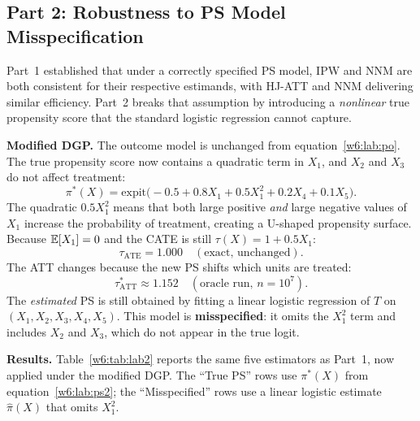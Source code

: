 \documentclass[master.tex]{subfiles}
\begin{document}
\subsection{Part 2: Robustness to PS Model Misspecification}
\label{w6:sec:lab:part2}

Part~1 established that under a correctly specified PS model, IPW and
NNM are both consistent for their respective estimands, with HJ-ATT
and NNM delivering similar efficiency.  Part~2 breaks that assumption
by introducing a \emph{nonlinear} true propensity score that the
standard logistic regression cannot capture.

\medskip\noindent\textbf{Modified DGP.}
The outcome model is unchanged from equation~\eqref{w6:lab:po}.  The
true propensity score now contains a quadratic term in $X_1$, and $X_2$
and $X_3$ do not affect treatment:
\begin{equation}
  \pi^*(X) = \mathrm{expit}\!\bigl(-0.5 + 0.8X_1 + 0.5X_1^2 + 0.2X_4 + 0.1X_5\bigr).
  \label{w6:lab:ps2}
\end{equation}
The quadratic $0.5X_1^2$ means that both large positive \emph{and}
large negative values of $X_1$ increase the probability of treatment,
creating a U-shaped propensity surface.  Because $\mathbb{E}[X_1] = 0$ and
the CATE is still $\tau(X) = 1 + 0.5X_1$:
\[
  \tau_{\mathrm{ATE}} = 1.000 \quad (\text{exact, unchanged}).
\]
The ATT changes because the new PS shifts which units are treated:
\begin{equation}
  \tau_{\mathrm{ATT}}^* \approx 1.152
  \quad (\text{oracle run, }n = 10^7).
  \label{w6:lab:att2}
\end{equation}
The \emph{estimated} PS is still obtained by fitting a linear logistic
regression of $T$ on $(X_1, X_2, X_3, X_4, X_5)$.  This model is
\textbf{misspecified}: it omits the $X_1^2$ term and includes $X_2$
and $X_3$, which do not appear in the true logit.

\medskip\noindent\textbf{Results.}
Table~\ref{w6:tab:lab2} reports the same five estimators as Part~1,
now applied under the modified DGP.  The ``True PS'' rows use
$\pi^*(X)$ from equation~\eqref{w6:lab:ps2}; the ``Misspecified''
rows use a linear logistic estimate $\hat\pi(X)$ that omits $X_1^2$.
\end{document}
